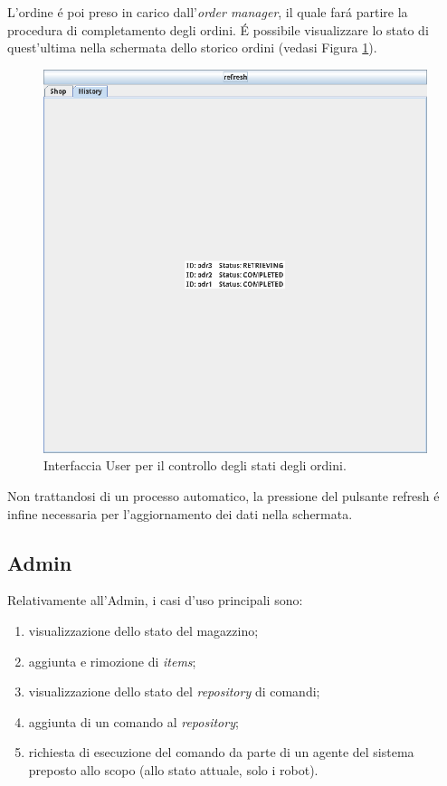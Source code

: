 L'ordine \'e poi preso in carico dall'\textit{order manager}, il quale far\'a partire la procedura di completamento degli ordini. \'E possibile visualizzare lo stato di quest'ultima nella schermata dello storico ordini (vedasi Figura \ref{fig:application-history}).
\begin{figure}[!ht]\centering
    \includegraphics[width=.75\textwidth]{section/usage_examples/figure/application-history.png}
    \caption{Interfaccia User per il controllo degli stati degli ordini.}
    \label{fig:application-history}
\end{figure}

Non trattandosi di un processo automatico, la pressione del pulsante refresh \'e infine necessaria per l'aggiornamento dei dati nella schermata.

\subsection{Admin}
Relativamente all'Admin, i casi d'uso principali sono:
\begin{enumerate}
    \item visualizzazione dello stato del magazzino;
    \item aggiunta e rimozione di \textit{items};
    \item visualizzazione dello stato del \textit{repository} di comandi;
    \item aggiunta di un comando al \textit{repository};
    \item richiesta di esecuzione del comando da parte di un agente del sistema preposto allo scopo (allo stato attuale, solo i robot).
\end{enumerate}

